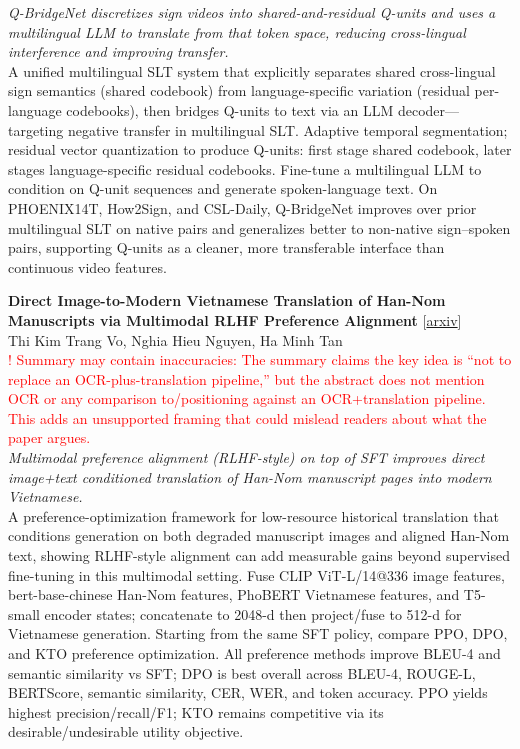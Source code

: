 \documentclass[12pt,letterpaper]{article}
\begin{document}
{\small\textit{Q-BridgeNet discretizes sign videos into shared-and-residual Q-units and uses a multilingual LLM to translate from that token space, reducing cross-lingual interference and improving transfer.}}\\[1pt]
{\footnotesize A unified multilingual SLT system that explicitly separates shared cross-lingual sign semantics (shared codebook) from language-specific variation (residual per-language codebooks), then bridges Q-units to text via an LLM decoder---targeting negative transfer in multilingual SLT. Adaptive temporal segmentation; residual vector quantization to produce Q-units: first stage shared codebook, later stages language-specific residual codebooks. Fine-tune a multilingual LLM to condition on Q-unit sequences and generate spoken-language text. On PHOENIX14T, How2Sign, and CSL-Daily, Q-BridgeNet improves over prior multilingual SLT on native pairs and generalizes better to non-native sign--spoken pairs, supporting Q-units as a cleaner, more transferable interface than continuous video features.}

\medskip

{\small\textbf{Direct Image-to-Modern Vietnamese Translation of Han-Nom Manuscripts via Multimodal RLHF Preference Alignment}} {\scriptsize[\href{https://arxiv.org/abs/2607.11434}{arxiv}]}\\
{\scriptsize Thi Kim Trang Vo, Nghia Hieu Nguyen, Ha Minh Tan}\\

{\scriptsize\textcolor{red}{! Summary may contain inaccuracies: The summary claims the key idea is ``not to replace an OCR-plus-translation pipeline,'' but the abstract does not mention OCR or any comparison to/positioning against an OCR+translation pipeline. This adds an unsupported framing that could mislead readers about what the paper argues.}}\\[1pt]

{\small\textit{Multimodal preference alignment (RLHF-style) on top of SFT improves direct image+text conditioned translation of Han-Nom manuscript pages into modern Vietnamese.}}\\[1pt]
{\footnotesize A preference-optimization framework for low-resource historical translation that conditions generation on both degraded manuscript images and aligned Han-Nom text, showing RLHF-style alignment can add measurable gains beyond supervised fine-tuning in this multimodal setting. Fuse CLIP ViT-L/14@336 image features, bert-base-chinese Han-Nom features, PhoBERT Vietnamese features, and T5-small encoder states; concatenate to 2048-d then project/fuse to 512-d for Vietnamese generation. Starting from the same SFT policy, compare PPO, DPO, and KTO preference optimization. All preference methods improve BLEU-4 and semantic similarity vs SFT; DPO is best overall across BLEU-4, ROUGE-L, BERTScore, semantic similarity, CER, WER, and token accuracy. PPO yields highest precision/recall/F1; KTO remains competitive via its desirable/undesirable utility objective.}
\end{document}
